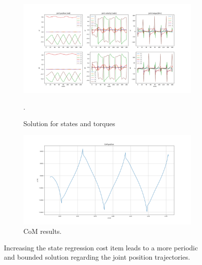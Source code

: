 \begin{figure}[h!]
\centering
\begin{subfigure}{.8\textwidth}
  \centering
  \includegraphics[width=1\linewidth]{Media/Crocoddyl/RH5/FixedPeriodicity/RH5PeriodicGait_Solution.png}
  \caption{Solution for states and torques}.
\end{subfigure}
\begin{subfigure}{.8\textwidth}
  \centering
  \includegraphics[width=1\linewidth]{Media/Crocoddyl/RH5/FixedPeriodicity/RH5PeriodicGait_CoM.png}
\caption{CoM results.}
\end{subfigure}
\caption{Increasing the state regression cost item leads to a more periodic and bounded solution regarding the joint position trajectories.}
\label{fig:rh5_periodic}
\centering
\end{figure}








 